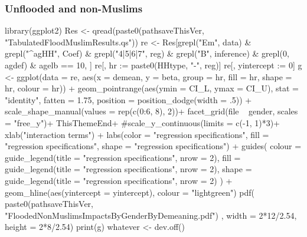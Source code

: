 \clearpage
\subsubsection{Unflooded and non-Muslims}


\begin{Schunk}
\begin{Sinput}
library(ggplot2)
Res <- qread(paste0(pathsaveThisVer, "TabulatedFloodMuslimResults.qs"))
re <- Res[grepl("Em", data) & grepl("^agHH", Coef) & grepl("4|5|6|7", reg) & grepl("B", inference)
   & grepl(0, agdef) & agelb == 10, ]
re[, hr := paste0(HHtype, "-", reg)]
re[, yintercept := 0]
g <- ggplot(data = re, 
    aes(x = demean, y = beta, group = hr, fill = hr, shape = hr, colour = hr)) + 
  geom_pointrange(aes(ymin = CI_L, ymax = CI_U),
    stat = "identity", fatten = 1.75, 
    position = position_dodge(width = .5)) +
  scale_shape_manual(values = rep(c(0:6, 8), 2))+
  facet_grid(file ~ gender, scales = "free_y")+
  ThisThemeEnd+
  #scale_y_continuous(limits = c(-1, 1)*3)+
  xlab("interaction terms") + 
  labs(color  = "regression specifications", fill = "regression specifications", 
    shape = "regression specifications") +
  guides(
    colour = guide_legend(title = "regression specifications", nrow = 2),
    fill = guide_legend(title = "regression specifications", nrow = 2),
    shape = guide_legend(title = "regression specifications", nrow = 2)
    ) +
  geom_hline(aes(yintercept = yintercept), colour = "lightgreen")
pdf(
  paste0(pathsaveThisVer, "FloodedNonMuslimsImpactsByGenderByDemeaning.pdf")
  , width = 2*12/2.54, height = 2*8/2.54)
print(g)
whatever <- dev.off()
\end{Sinput}
\end{Schunk}





